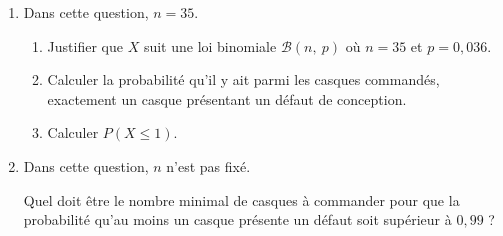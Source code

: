 \medskip

\begin{enumerate}
\item Dans cette question, $n = 35$.
	\begin{enumerate}
		\item Justifier que $X$ suit une loi binomiale $\mathcal{B}(n,~p)$ où $n = 35$ et $p = 0,036$.
		\item Calculer la probabilité qu'il y ait parmi les casques commandés, exactement un casque présentant un défaut de conception.
		\item Calculer $P(X \leqslant 1)$.
	\end{enumerate}	
\item Dans cette question, $n$ n'est pas fixé.

Quel doit être le nombre minimal de casques à commander pour que la probabilité 
 qu'au moins un casque présente un défaut soit supérieur à $0,99$ ?
\end{enumerate}

\bigskip
